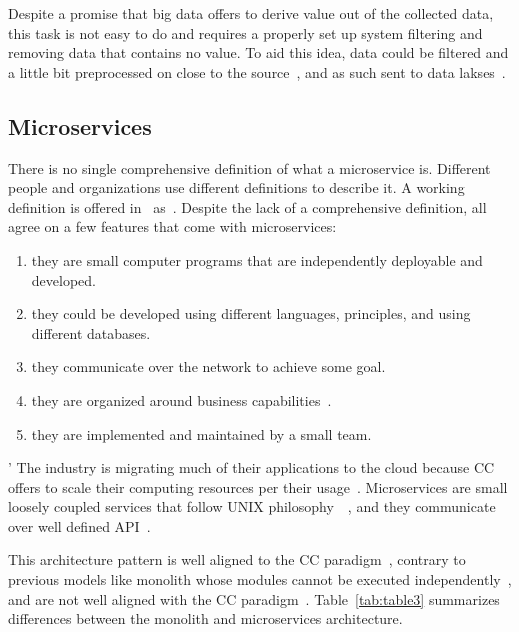 Despite a promise that big data offers to derive value out of the collected data, this task is not easy to do and requires a properly set up system filtering and removing data that contains no value. To aid this idea, data could be filtered and a little bit preprocessed on close to the source~\cite{inproceedingsSimic1}, and as such sent to data lakses~\cite{MarynowskiSP15}.
%
%
\subsection{Microservices}\label{sec:microservices}
%
There is no single comprehensive definition of what a microservice is. Different people and organizations use different definitions to describe it. A working definition is offered in~\cite{DragoniGLMMMS16} as~. Despite the lack of a comprehensive definition, all agree on a few features that come with microservices:

\begin{enumerate}[start=1,label={(\bfseries \arabic*)}]
	\item they are small computer programs that are independently deployable and developed.
	\item they could be developed using different languages, principles, and using different databases.
	\item they communicate over the network to achieve some goal.
	\item they are organized around business capabilities~\cite{PautassoZALJ17}.
	\item they are implemented and maintained by a small team.
\end{enumerate}

'\noindent
The industry is migrating much of their applications to the cloud because CC offers to scale their computing resources per their usage~\cite{LiZJLZLGGS19}. Microservices are small loosely coupled services that follow UNIX philosophy~~\cite{krause2015microservices}, and they communicate over well defined API~\cite{DragoniGLMMMS16}.

This architecture pattern is well aligned to the CC paradigm~\cite{LiZJLZLGGS19}, contrary to previous models like monolith whose modules cannot be executed independently~\cite{DragoniGLMMMS16, abs-1905-07997}, and are not well aligned with the CC paradigm~\cite{abs-1905-07997}. Table~\ref{tab:table3} summarizes differences between the monolith and microservices architecture.

